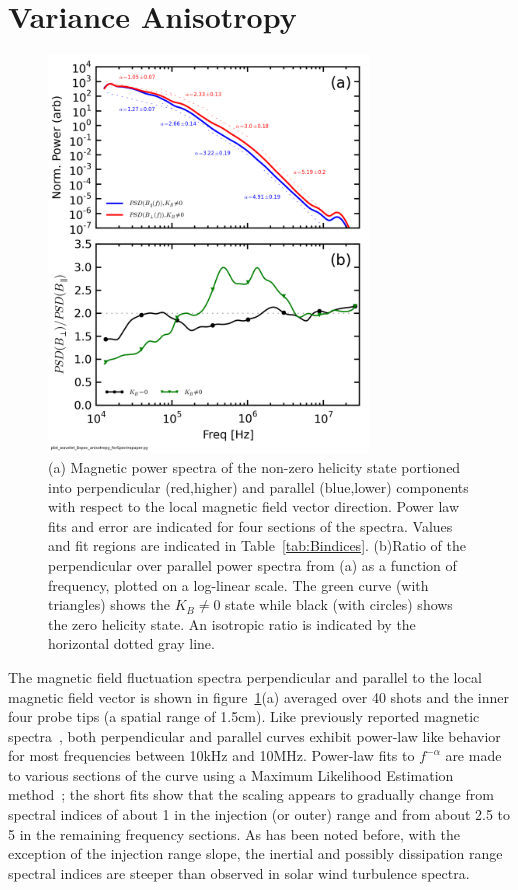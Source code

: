 \documentclass[aip,prl,amsmath,amssymb,reprint,superscriptaddress]{revtex4-1} %
\begin{document}
\section{Variance Anisotropy}\label{sec:variance}

\begin{figure}[!htbp]
\centerline{
\includegraphics[width=8.5cm]{Bperppara_chan1t4_1mWbspectra_40t60us_wAsymRatio}}
\caption{\label{fig:spectra} (a) Magnetic power spectra of the non-zero helicity state portioned into perpendicular (red,higher) and parallel (blue,lower) components with respect to the local magnetic field vector direction. Power law fits and error are indicated for four sections of the spectra. Values and fit regions are indicated in Table~\ref{tab:Bindices}. (b)Ratio of the perpendicular over parallel power spectra from (a) as a function of frequency, plotted on a log-linear scale. The green curve (with triangles) shows the $K_{B}\neq 0$ state while black (with circles) shows the zero helicity state. An isotropic ratio is indicated by the horizontal dotted gray line.}
\end{figure}

The magnetic field fluctuation spectra perpendicular and parallel to the local magnetic field vector is shown in figure~\ref{fig:spectra}(a) averaged over 40 shots and the inner four probe tips (a spatial range of 1.5cm). Like previously reported magnetic spectra~\cite{schaffner14a}, both perpendicular and parallel curves exhibit power-law like behavior for most frequencies between 10kHz and 10MHz. Power-law fits to $f^{-\alpha}$ are made to various sections of the curve using a Maximum Likelihood Estimation method~\cite{clauset09}; the short fits show that the scaling appears to gradually change from spectral indices of about 1 in the injection (or outer) range and from about 2.5 to 5 in the remaining frequency sections. As has been noted before, with the exception of the injection range slope, the inertial and possibly dissipation range spectral indices are steeper than observed in solar wind turbulence spectra.
\end{document}
